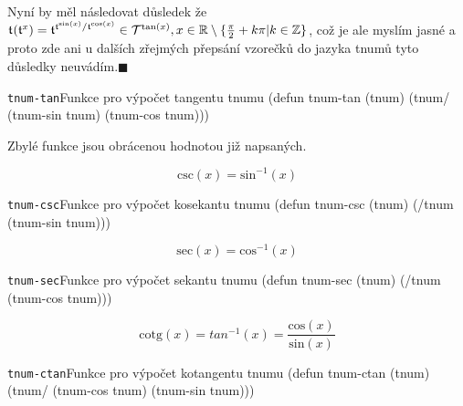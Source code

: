\begin{convention}
Nyní by měl následovat důsledek že $\mathfrak{t}^{}(\mathfrak{t}^{x})=\mathfrak{t}^{\mathfrak{t}^{\mathrm{sin}(x)}/\mathfrak{t}^{\mathrm{cos}(x)}}\in\mathcal{T}^{\mathrm{tan}(x)},x\in\mathbb{R}\setminus\{\frac{\pi}{2}+k\pi|k\in\mathbb{Z}\}$, což je ale myslím jasné a proto zde ani u dalších zřejmých přepsání vzorečků do jazyka tnumů tyto důsledky neuvádím.\hfill$\blacksquare$
\end{convention}

\begin{lispcode}{\texttt{tnum-tan}}{Funkce pro výpočet tangentu tnumu}
(\textcolor{funkcionalni}{defun} \textcolor{pojmenovan}{tnum-tan} (tnum)
  (\textcolor{moje}{tnum/} (\textcolor{moje}{tnum-sin} tnum) (\textcolor{moje}{tnum-cos} tnum)))
\end{lispcode}

Zbylé funkce jsou obrácenou hodnotou již napsaných.

\begin{fact}
  \begin{equation}
    \mathrm{csc}(x)=\mathrm{sin}^{-1}(x)
  \end{equation}
\end{fact}
\begin{lispcode}{\texttt{tnum-csc}}{Funkce pro výpočet kosekantu tnumu}
(\textcolor{funkcionalni}{defun} \textcolor{pojmenovan}{tnum-csc} (tnum)
  (\textcolor{moje}{/tnum} (\textcolor{moje}{tnum-sin} tnum)))
\end{lispcode}

\begin{fact}
  \begin{equation}
    \mathrm{sec}(x)=\mathrm{cos}^{-1}(x)
  \end{equation}
\end{fact}
\begin{lispcode}{\texttt{tnum-sec}}{Funkce pro výpočet sekantu tnumu}
(\textcolor{funkcionalni}{defun} \textcolor{pojmenovan}{tnum-sec} (tnum)
  (\textcolor{moje}{/tnum} (\textcolor{moje}{tnum-cos} tnum)))
\end{lispcode}

\begin{fact}
  \begin{equation}
    \mathrm{cotg}(x)=tan^{-1}(x)=\frac{\mathrm{cos}(x)}{\mathrm{sin}(x)}
  \end{equation}
\end{fact}
\begin{lispcode}{\texttt{tnum-ctan}}{Funkce pro výpočet kotangentu tnumu}
(\textcolor{funkcionalni}{defun} \textcolor{pojmenovan}{tnum-ctan} (tnum)
  (\textcolor{moje}{tnum/} (\textcolor{moje}{tnum-cos} tnum) (\textcolor{moje}{tnum-sin} tnum)))
\end{lispcode}

